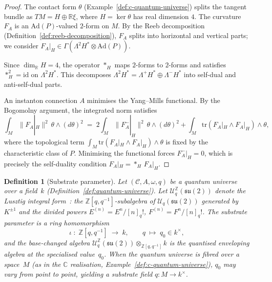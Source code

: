 \documentclass[12pt,a4paper]{report}
\newtheorem{definition}[theorem]{Definition}
\begin{document}
\begin{proof}
The contact form $\theta$ (Example~\ref{def:c-quantum-universe}) splits
the tangent bundle as $TM = H \oplus \mathbb{R}\xi$, where
$H = \ker\theta$ has real dimension $4$.  The curvature $F_A$ is an
$\mathrm{Ad}(P)$-valued $2$-form on $M$.  By the Reeb decomposition
(Definition~\ref{def:reeb-decomposition}), $F_A$ splits into horizontal and
vertical parts; we consider $F_A|_H \in \Gamma(\Lambda^2 H^* \otimes
\mathrm{Ad}(P))$.

Since $\dim_{\mathbb{R}} H = 4$, the operator $*_H$ maps $2$-forms to
$2$-forms and satisfies $*_H^2 = \mathrm{id}$ on $\Lambda^2 H^*$.  This
decomposes $\Lambda^2 H^* = \Lambda^+\! H^* \oplus \Lambda^-\! H^*$ into
self-dual and anti-self-dual parts.

An instanton connection $A$ minimises the Yang--Mills functional.  By the
Bogomolny argument, the integrated norm satisfies
\[
  \int_M \lVert F_A|_H \rVert^2 \,\theta \wedge (d\theta)^2
  \;=\; 2\!\int_M \lVert F_A^-|_H \rVert^2 \,\theta \wedge (d\theta)^2
        + \int_M \mathrm{tr}(F_A|_H \wedge F_A|_H)
          \wedge \theta,
\]
where the topological term
$\int_M \mathrm{tr}(F_A|_H \wedge F_A|_H) \wedge \theta$ is fixed by the
characteristic class of $P$.  Minimising the functional forces
$F_A^-|_H = 0$, which is precisely the self-duality condition
$F_A|_H = {*_H}\,F_A|_H$.
\end{proof}







\begin{definition}[Substrate parameter]
\label{def:substrate-parameter}
Let $(\mathcal{C}, A, \omega, q)$ be a quantum universe over a field~$k$
(Definition~\ref{def:quantum-universe}).  Let
$\mathcal{U}^{\mathbb{Z}}_q(\mathfrak{su}(2))$ denote the
\emph{Lusztig integral form}~\cite{lusztig1993}: the
$\mathbb{Z}[q,q^{-1}]$-subalgebra of $\mathcal{U}_q(\mathfrak{su}(2))$
generated by $K^{\pm 1}$ and the divided powers
$E^{(n)} = E^n/[n]_q!$, $F^{(n)} = F^n/[n]_q!$.
The \emph{substrate parameter} is a ring homomorphism
\[
  \iota \;\colon\; \mathbb{Z}[q, q^{-1}] \;\longrightarrow\; k,
  \qquad q \;\longmapsto\; q_0 \in k^{\times},
\]
and the base-changed algebra
$\mathcal{U}^{\mathbb{Z}}_q(\mathfrak{su}(2))
  \otimes_{\mathbb{Z}[q,q^{-1}]} k$
is the quantised enveloping algebra at the specialised value~$q_0$.
When the quantum universe is fibred over a space~$M$ (as in the
$\mathbb{C}$ realisation, Example~\ref{def:c-quantum-universe}), $q_0$
may vary from point to point, yielding a \emph{substrate field}
$q \colon M \to k^{\times}$.
\end{definition}
\end{document}
